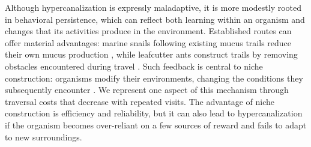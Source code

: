 \documentclass[12pt,fleqn]{article}
\begin{document}
%
%

Although hypercanalization is expressly maladaptive, it is more modestly rooted in behavioral persistence, which can reflect both learning within an organism and changes that its activities produce in the environment. Established routes can offer material advantages: marine snails following existing mucus trails reduce their own mucus production \cite{davies_energy_2007}, while leafcutter ants construct trails by removing obstacles encountered during travel \cite{bochynek_infrastructure_2019}. Such feedback is central to niche construction: organisms modify their environments, changing the conditions they subsequently encounter \cite{laland_niche_2016}. We represent one aspect of this mechanism through traversal costs that decrease with repeated visits. The advantage of niche construction is efficiency and reliability, but it can also lead to hypercanalization if the organism becomes over-reliant on a few sources of reward and fails to adapt to new surroundings.
\end{document}
